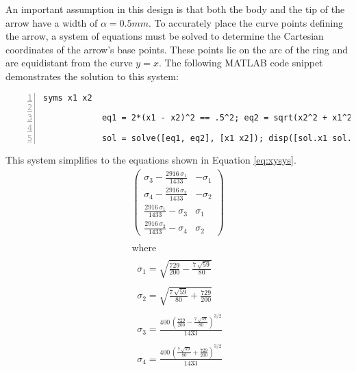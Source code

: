        An important assumption in this design is that both the body and the 
        tip of the arrow have a width of $\alpha=0.5 mm$. To accurately place
        the curve points defining the arrow, a system of equations must be 
        solved to determine the Cartesian coordinates of the arrow's base points. 
        These points lie on the arc of the ring and are equidistant from the curve 
        $y=x$. The following MATLAB code snippet demonstrates the solution to this 
        system:
        \begin{lstlisting}[frame=single, numbers=left, style=Matlab-Pyglike]
            syms x1 x2

            eq1 = 2*(x1 - x2)^2 == .5^2; eq2 = sqrt(x2^2 + x1^2) == 2.7;

            sol = solve([eq1, eq2], [x1 x2]); disp([sol.x1 sol.x2]);  
        \end{lstlisting}
        
        This system simplifies to the equations shown in Equation \ref{eq:xysys}.
        \begin{equation}
            \label{eq:xysys}
            \displaystyle \begin{array}{l} 
                \left(\begin{array}{cc} 
                    \sigma_3 -\frac{2916\,\sigma_1 }{1433} & -\sigma_1 \\
                    \sigma_4 -\frac{2916\,\sigma_2 }{1433} & -\sigma_2 \\
                    \frac{2916\,\sigma_1 }{1433}-\sigma_3  & \sigma_1 \\
                    \frac{2916\,\sigma_2 }{1433}-\sigma_4  & \sigma_2  
                \end{array}\right)\\
                \mathrm{}\\
                \textrm{where}\\
                \mathrm{}\\
                \;\;\sigma_1 =\sqrt{\frac{729}{200}-\frac{7\,\sqrt{59}}{80}}\\
                \mathrm{}\\
                \;\;\sigma_2 =\sqrt{\frac{7\,\sqrt{59}}{80}+\frac{729}{200}}\\
                \mathrm{}\\
                \;\;\sigma_3 =\frac{400\,{{\left(\frac{729}{200}-\frac{7\,\sqrt{59}}{80}\right)}}^{3/2} }{1433}\\
                \mathrm{}\\
                \;\;\sigma_4 =\frac{400\,{{\left(\frac{7\,\sqrt{59}}{80}+\frac{729}{200}\right)}}^{3/2} }{1433}
            \end{array}
        \end{equation}

